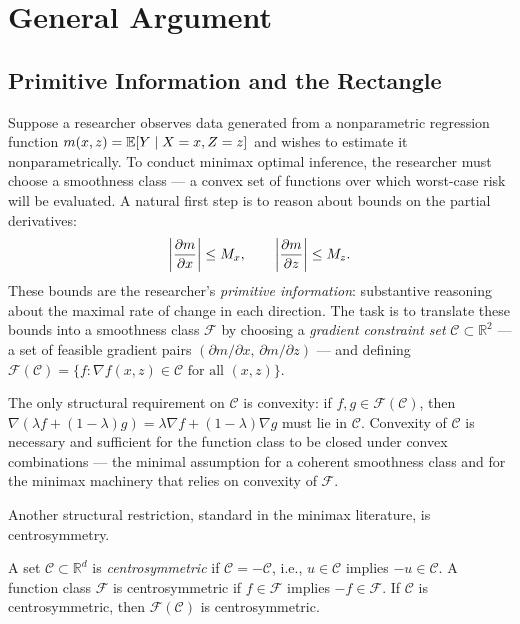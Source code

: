 \section{General Argument}\label{sec:argument}

\subsection{Primitive Information and the Rectangle}\label{sec:argument:primitives}

Suppose a researcher observes data generated from a nonparametric regression function $m(x,z) = \E[Y \mid X = x, Z = z]$ and wishes to estimate it nonparametrically.
To conduct minimax optimal inference, the researcher must choose a smoothness class --- a convex set of functions over which worst-case risk will be evaluated.
A natural first step is to reason about bounds on the partial derivatives:
\begin{equation*}
	\abs*{\frac{\partial m}{\partial x}} \leq M_x, \qquad \abs*{\frac{\partial m}{\partial z}} \leq M_z.
\end{equation*}
These bounds are the researcher's \emph{primitive information}: substantive reasoning about the maximal rate of change in each direction.
The task is to translate these bounds into a smoothness class $\mathcal{F}$ by choosing a \emph{gradient constraint set} $\mathcal{C} \subset \mathbb{R}^2$ --- a set of feasible gradient pairs $(\partial m / \partial x,\, \partial m / \partial z)$ --- and defining $\mathcal{F}(\mathcal{C}) = \{ f : \nabla f(x,z) \in \mathcal{C} \text{ for all } (x,z) \}$.

The only structural requirement on $\mathcal{C}$ is convexity: if $f, g \in \mathcal{F}(\mathcal{C})$, then $\nabla(\lambda f + (1-\lambda)g) = \lambda \nabla f + (1-\lambda) \nabla g$ must lie in $\mathcal{C}$.
Convexity of $\mathcal{C}$ is necessary and sufficient for the function class to be closed under convex combinations --- the minimal assumption for a coherent smoothness class and for the minimax machinery that relies on convexity of $\mathcal{F}$.

Another structural restriction, standard in the minimax literature, is centrosymmetry. 

\begin{definition}[Centrosymmetry]\label{def:centrosymmetric}
	A set $\mathcal{C} \subset \mathbb{R}^d$ is \emph{centrosymmetric} if $\mathcal{C} = -\mathcal{C}$, i.e., $u \in \mathcal{C}$ implies $-u \in \mathcal{C}$.
	A function class $\mathcal{F}$ is centrosymmetric if $f \in \mathcal{F}$ implies $-f \in \mathcal{F}$.
	If $\mathcal{C}$ is centrosymmetric, then $\mathcal{F}(\mathcal{C})$ is centrosymmetric.
\end{definition}

